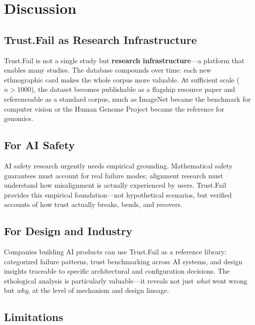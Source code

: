 \documentclass[11pt,a4paper]{article}
\begin{document}
\section{Discussion}

\subsection{Trust.Fail as Research Infrastructure}

Trust.Fail is not a single study but \textbf{research infrastructure}---a platform that enables many studies. The database compounds over time: each new ethnographic card makes the whole corpus more valuable. At sufficient scale ($n > 1000$), the dataset becomes publishable as a flagship resource paper and referenceable as a standard corpus, much as ImageNet became the benchmark for computer vision or the Human Genome Project became the reference for genomics.

\subsection{For AI Safety}

AI safety research urgently needs empirical grounding. Mathematical safety guarantees must account for real failure modes; alignment research must understand how misalignment is actually experienced by users. Trust.Fail provides this empirical foundation---not hypothetical scenarios, but verified accounts of how trust actually breaks, bends, and recovers.

\subsection{For Design and Industry}

Companies building AI products can use Trust.Fail as a reference library: categorized failure patterns, trust benchmarking across AI systems, and design insights traceable to specific architectural and configuration decisions. The ethological analysis is particularly valuable---it reveals not just \textit{what} went wrong but \textit{why}, at the level of mechanism and design lineage.

\subsection{Limitations}
\end{document}
